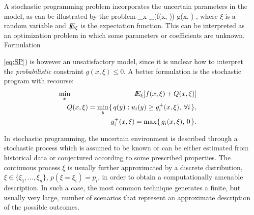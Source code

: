 A stochastic programming problem incorporates the uncertain parameters
in the model, as can be illustrated by the problem
%
\be \label{eq:SP}
\min_x \E_\xi(f(x, \xi)) \;\; g(x, \xi) ,
\ee
%
where $\xi$ is a random variable and $I\!\!E_\xi$ is the expectation function.
This can be interpreted as an optimization
problem in which some parameters or coefficients are unknown.
Formulation {\ref{eq:SP}) is however an unsatisfactory model, since
it is unclear how to interpret the {\em probabilistic} constraint
$g(x,\xi) \le 0$. A better formulation is the stochastic program
with recourse:
%
\begin{eqnarray} \label{eq:SPRecourse}
\min_x \hspace{-1.5em} && \E_\xi[f(x, \xi) + Q(x, \xi)] \nonumber \\ 
  && Q(x,\xi) = \min_y \{\, q(y) : u_i(y) \ge g_i^+(x, \xi),\:\forall i \,\},\\
  && g_i^+(x, \xi) = \max \{\, g_i(x, \xi), \, 0 \,\}. \nonumber
\end{eqnarray}


In stochastic programming, the uncertain environment is 
described through a stochastic process which is assumed to be 
known or can be either estimated from historical data or 
conjectured according to some prescribed properties. The 
continuous process $\xi$ is usually further approximated by a discrete 
distribution, $\xi \in \{\xi_1, \ldots,\xi_n\}$, $p(\xi=\xi_i) = p_i$,
in order to obtain a computationally amenable description. 
%
In such a case, the most common technique generates a 
finite, but usually very large, number of scenarios that represent an 
approximate description of the possible outcomes.


}
